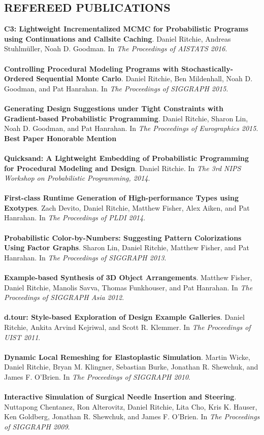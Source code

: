 \documentclass[line,margin]{res}
\begin{document}
\begin{resume}
\section{REFEREED PUBLICATIONS}
\textbf{C3: Lightweight Incrementalized MCMC for Probabilistic Programs using Continuations and Callsite Caching}. 
Daniel Ritchie, Andreas Stuhlm\"uller, Noah D. Goodman. 
In \emph{The Proceedings of AISTATS 2016}.
\\ \\
\textbf{Controlling Procedural Modeling Programs with Stochastically-Ordered Sequential Monte Carlo}. 
Daniel Ritchie, Ben Mildenhall, Noah D. Goodman, and Pat Hanrahan. 
In \emph{The Proceedings of SIGGRAPH 2015}.
\\ \\
\textbf{Generating Design Suggestions under Tight Constraints with Gradient-based Probabilistic Programming}. 
Daniel Ritchie, Sharon Lin, Noah D. Goodman, and Pat Hanrahan. 
In \emph{The Proceedings of Eurographics 2015}. \textbf{Best Paper Honorable Mention}
\\ \\
\textbf{Quicksand: A Lightweight Embedding of Probabilistic Programming for Procedural Modeling and Design}. 
Daniel Ritchie. 
In \emph{The 3rd NIPS Workshop on Probabilistic Programming, 2014}.
\\ \\
\textbf{First-class Runtime Generation of High-performance Types using Exotypes}. 
Zach Devito, Daniel Ritchie, Matthew Fisher, Alex Aiken, and Pat Hanrahan. 
In \emph{The Proceedings of PLDI 2014}.
\\ \\
\textbf{Probabilistic Color-by-Numbers: Suggesting Pattern Colorizations Using Factor Graphs}. 
Sharon Lin, Daniel Ritchie, Matthew Fisher, and Pat Hanrahan. 
In \emph{The Proceedings of SIGGRAPH 2013}.
\\ \\
\textbf{Example-based Synthesis of 3D Object Arrangements}. 
Matthew Fisher, Daniel Ritchie, Manolis Savva, Thomas Funkhouser, and Pat Hanrahan. 
In \emph{The Proceedings of SIGGRAPH Asia 2012}.
\\ \\
\textbf{d.tour: Style-based Exploration of Design Example Galleries}. 
Daniel Ritchie, Ankita Arvind Kejriwal, and Scott R. Klemmer. 
In \emph{The Proceedings of UIST 2011}.
\\ \\
\textbf{Dynamic Local Remeshing for Elastoplastic Simulation}. 
Martin Wicke, Daniel Ritchie, Bryan M. Klingner, Sebastian Burke, Jonathan R. Shewchuk, and James F. O'Brien. 
In \emph{The Proceedings of SIGGRAPH 2010}.
\\ \\
\textbf{Interactive Simulation of Surgical Needle Insertion and Steering}. 
Nuttapong Chentanez, Ron Alterovitz, Daniel Ritchie, Lita Cho, Kris K. Hauser, Ken Goldberg, Jonathan R. Shewchuk, and James F. O'Brien. 
In \emph{The Proceedings of SIGGRAPH 2009}. 



\end{resume}
\end{document}
